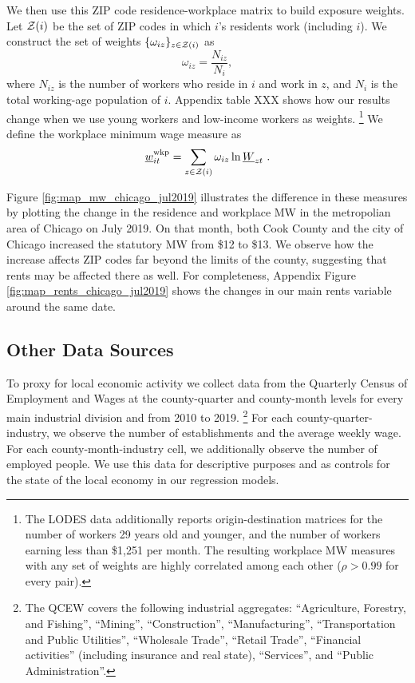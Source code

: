 We then use this ZIP code residence-workplace matrix to build exposure weights.
Let $\mathcal{Z}(i)$ be the set of ZIP codes in which $i$'s residents work 
(including $i$).
We construct the set of weights $\{\omega_{iz}\}_{z\in\mathcal{Z}(i)}$ as 
$$
\omega_{iz} = \frac{N_{iz}}{N_i} ,
$$
where 
$N_{iz}$ is the number of workers who reside in $i$ and work in $z$, 
and $N_i$ is the total working-age population of $i$.
Appendix table XXX shows how our results change when we use young workers
and low-income workers as weights.%
\footnote{The LODES data additionally reports origin-destination matrices for 
the number of workers 29 years old and younger, and the number of workers 
earning less than \$1,251 per month.
The resulting workplace MW measures with any set of weights are highly correlated 
among each other ($\rho>0.99$ for every pair).}
We define the workplace minimum wage measure as
\begin{equation}
    \underline{w}^{\text{wkp}}_{it} = \sum_{z\in\mathcal{Z}(i)} \omega_{iz} \ln \underline{W}_{zt} \ .
\end{equation}

Figure \ref{fig:map_mw_chicago_jul2019} illustrates the difference in these 
measures by plotting the change in the residence and workplace MW 
in the metropolian area of Chicago on July 2019.
On that month, both Cook County and the city of Chicago increased the statutory 
MW from \$12 to \$13.
We observe how the increase affects ZIP codes far beyond the limits of the 
county, suggesting that rents may be affected there as well.
For completeness, Appendix Figure \ref{fig:map_rents_chicago_jul2019} shows
the changes in our main rents variable around the same date.

\subsection{Other Data Sources}\label{sec:data_other}

To proxy for local economic activity we collect data from the 
Quarterly Census of Employment and Wages \parencite[QCEW;][]{QCEW} 
at the county-quarter and county-month levels 
for every main industrial division and from 2010 to 2019.%
\footnote{The QCEW covers the following industrial aggregates: 
``Agriculture, Forestry, and Fishing'', ``Mining'', ``Construction'', ``Manufacturing'', 
``Transportation and Public Utilities'', ``Wholesale Trade'', ``Retail Trade'',
``Financial activities'' (including insurance and real state), ``Services'', and 
``Public Administration''.}
For each county-quarter-industry, we observe the number of establishments and the 
average weekly wage. For each county-month-industry cell, we additionally observe the number 
of employed people. We use this data for descriptive purposes and as controls for the 
state of the local economy in our regression models.

